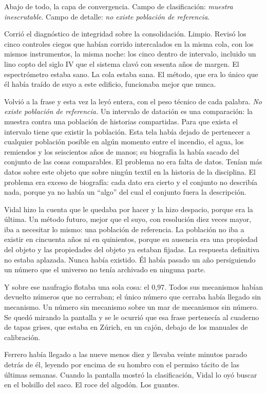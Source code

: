 Abajo de todo, la capa de convergencia. Campo de clasificación: \textit{muestra inescrutable}. Campo de detalle: \textit{no existe población de referencia}.

Corrió el diagnóstico de integridad sobre la consolidación. Limpio. Revisó los cinco controles ciegos que habían corrido intercalados en la misma cola, con los mismos instrumentos, la misma noche: los cinco dentro de intervalo, incluido un lino copto del siglo IV que el sistema clavó con sesenta años de margen. El espectrómetro estaba sano. La cola estaba sana. El método, que era lo único que él había traído de suyo a este edificio, funcionaba mejor que nunca.

Volvió a la frase y esta vez la leyó entera, con el peso técnico de cada palabra. \textit{No existe población de referencia.} Un intervalo de datación es una comparación: la muestra contra una población de historias compartidas. Para que exista el intervalo tiene que existir la población. Esta tela había dejado de pertenecer a cualquier población posible en algún momento entre el incendio, el agua, los remiendos y los seiscientos años de manos; su biografía la había sacado del conjunto de las cosas comparables. El problema no era falta de datos. Tenían más datos sobre este objeto que sobre ningún textil en la historia de la disciplina. El problema era exceso de biografía: cada dato era cierto y el conjunto no describía nada, porque ya no había un ``algo'' del cual el conjunto fuera la descripción.

Vidal hizo la cuenta que le quedaba por hacer y la hizo despacio, porque era la última. Un método futuro, mejor que el suyo, con resolución diez veces mayor, iba a necesitar lo mismo: una población de referencia. La población no iba a existir en cincuenta años ni en quinientos, porque su ausencia era una propiedad del objeto y las propiedades del objeto ya estaban fijadas. La respuesta definitiva no estaba aplazada. Nunca había existido. Él había pasado un año persiguiendo un número que el universo no tenía archivado en ninguna parte.

Y sobre ese naufragio flotaba una sola cosa: el 0,97. Todos sus mecanismos habían devuelto números que no cerraban; el único número que cerraba había llegado sin mecanismo. Un número sin mecanismo sobre un mar de mecanismos sin número. Se quedó mirando la pantalla y se le ocurrió que esa frase pertenecía al cuaderno de tapas grises, que estaba en Zúrich, en un cajón, debajo de los manuales de calibración.

Ferrero había llegado a las nueve menos diez y llevaba veinte minutos parado detrás de él, leyendo por encima de su hombro con el permiso tácito de las últimas semanas. Cuando la pantalla mostró la clasificación, Vidal lo oyó buscar en el bolsillo del saco. El roce del algodón. Los guantes.

